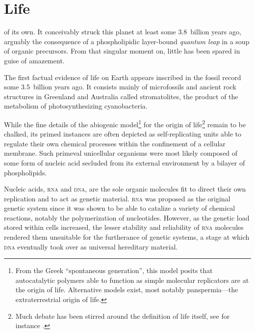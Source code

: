 \documentclass{tufte-book}
\begin{document}
\section{Life}

 of its own.  It conceivably struck this planet at
least some 3.8~billion years ago,\cite{mojzsis_evidence_1996} arguably the
consequence of a phospholipidic \mbox{layer-bound} \emph{quantum leap} in a soup
of organic precursors.\cite{miller_organic_1959} From that singular moment on,
little has been spared in guise of amazement.\bigskip

The first factual evidence of life on Earth appears inscribed in the fossil
record some 3.5~billion years ago.  It consists mainly of microfossils and
ancient rock structures in Greenland and Australia called
stromatolites,\cite{ohtomo_evidence_2014,noffke_microbially_2013} the product of
the metabolism of photosynthesizing cyanobacteria.

While the fine details of the abiogenic model\footnote{From the Greek
  ``spontaneous generation'', this model posits that autocatalytic polymers able
  to function as simple molecular replicators are at the origin of life.
  Alternative models exist, most notably panspermia---the extraterrestrial
  origin of life.} for the origin of life\footnote{Much debate has been stirred
  around the definition of life itself, see for instance
  \citealp{benner_defining_2010}.} remain to be chalked, its primed instances
are often depicted as \mbox{self-replicating} units able to regulate their own
chemical processes within the confinement of a cellular membrane.  Such primeval
unicellular organisms were most likely composed of some form of nucleic acid
secluded from its external environment by a bilayer of phospholipids.

Nucleic acids, \textsc{rna} and \textsc{dna}, are the sole organic molecules fit
to direct their own replication and to act as genetic material.  \textsc{rna}
was proposed as the original genetic system since it was shown to be able to
catalize a variety of chemical reactions, notably the polymerization of
nucleotides.\cite{bass_specific_1984} However, as the genetic load stored within
cells increased, the lesser stability and reliability of \textsc{rna} molecules
rendered them unsuitable for the furtherance of genetic systems, a stage at
which \textsc{dna} eventually took over as universal hereditary material.
\end{document}
